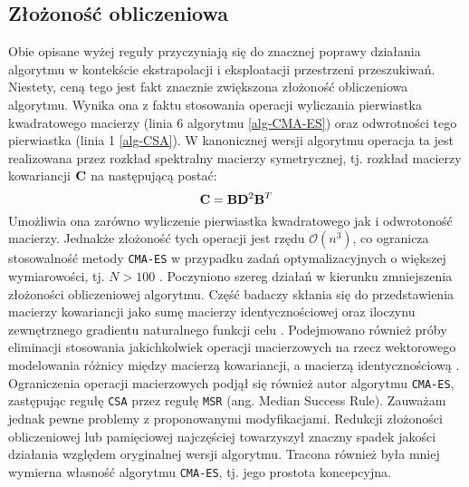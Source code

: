 \subsection{Złożoność obliczeniowa}
  Obie opisane wyżej reguły przyczyniają się do znacznej poprawy działania algorytmu w kontekście ekstrapolacji i eksploatacji przestrzeni przeszukiwań. Niestety, ceną tego jest fakt znacznie zwiększona złożoność obliczeniowa algorytmu. Wynika ona z faktu stosowania operacji wyliczania pierwiastka kwadratowego macierzy (linia 6 algorytmu \ref{alg-CMA-ES}) oraz odwrotności tego pierwiastka (linia 1 \ref{alg-CSA}).
  W kanonicznej wersji algorytmu operacja ta jest realizowana przez rozkład spektralny macierzy symetrycznej, tj. rozkład macierzy kowariancji ${\bf C}$ na następującą postać:
  \begin{equation}
    {\bf C} = {\bf B}{\bf D}^{2}{\bf B}^{T}
  \end{equation}
  Umożliwia ona zarówno wyliczenie pierwiastka kwadratowego jak i odwrotoność macierzy. Jednakże złożoność tych operacji jest rzędu $\mathcal{O}(n^3)$, co ogranicza stosowalność metody \texttt{CMA-ES} w przypadku zadań optymalizacyjnych o większej wymiarowości, tj. $N > 100$ \cite{hansen2006cma}.
  Poczyniono szereg działań w kierunku zmniejszenia złożoności obliczeniowej algorytmu. Część badaczy skłania się do przedstawienia macierzy kowariancji jako sumę macierzy identycznościowej oraz iloczynu zewnętrznego gradientu naturalnego funkcji celu \cite{Poland2001}. Podejmowano również próby eliminacji stosowania jakichkolwiek operacji macierzowych na rzecz wektorowego modelowania różnicy między macierzą kowariancji, a macierzą identycznościową \cite{Loshchilov2017}.
  Ograniczenia operacji macierzowych podjął się również autor algorytmu \texttt{CMA-ES}, zastępując regułę \texttt{CSA} przez regułę \texttt{MSR} (ang. Median Success Rule).
  Zauważam jednak pewne problemy z proponowanymi modyfikacjami. Redukcji złożoności obliczeniowej lub pamięciowej najczęściej towarzyszył znaczny spadek jakości działania względem oryginalnej wersji algorytmu. Tracona również była mniej wymierna własność algorytmu \texttt{CMA-ES}, tj. jego prostota koncepcyjna. 
